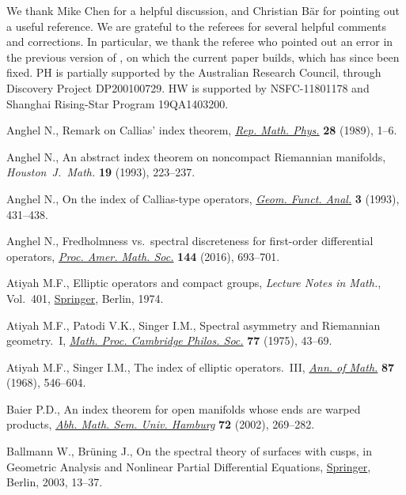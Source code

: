\documentclass[pdftex]{sigma}%
\numberwithin{equation}{section}
\begin{document}
We thank Mike Chen for a helpful discussion, and Christian B\"ar for pointing out a useful reference. We are grateful to the referees for several helpful comments and corrections. In particular, we thank the referee who pointed out an error in the previous version of \cite{HW21a}, on which the current paper builds, which has since been fixed.
PH is partially supported by the Australian Research Council, through Discovery Project DP200100729. HW is supported by NSFC-11801178 and Shanghai Rising-Star Program 19QA1403200.

\begin{thebibliography}{99}
\footnotesize\itemsep=0pt

Anghel N., Remark on {C}allias' index theorem, \href{https://doi.org/10.1016/0034-4877(89)90022-0}{\textit{Rep. Math. Phys.}}
 \textbf{28} (1989), 1--6.

Anghel N., An abstract index theorem on noncompact {R}iemannian manifolds,
 \textit{Houston~J.~Math.} \textbf{19} (1993), 223--237.

Anghel N., On the index of {C}allias-type operators, \href{https://doi.org/10.1007/BF01896237}{\textit{Geom. Funct.
 Anal.}} \textbf{3} (1993), 431--438.

Anghel N., Fredholmness vs.\ spectral discreteness for first-order differential
 operators, \href{https://doi.org/10.1090/proc12741}{\textit{Proc. Amer. Math. Soc.}} \textbf{144} (2016), 693--701.

Atiyah M.F., Elliptic operators and compact groups, \textit{Lecture Notes in
 Math.}, Vol.~401, \href{https://doi.org/10.1007/BFb0057821}{Springer}, Berlin, 1974.

Atiyah M.F., Patodi V.K., Singer I.M., Spectral asymmetry and {R}iemannian
 geometry.~{I}, \href{https://doi.org/10.1017/S0305004100049410}{\textit{Math. Proc. Cambridge Philos. Soc.}} \textbf{77}
 (1975), 43--69.

Atiyah M.F., Singer I.M., The index of elliptic operators.~{III}, \href{https://doi.org/10.2307/1970717}{\textit{Ann.
 of Math.}} \textbf{87} (1968), 546--604.

Baier P.D., An index theorem for open manifolds whose ends are warped products,
 \href{https://doi.org/10.1007/BF02941677}{\textit{Abh. Math. Sem. Univ. Hamburg}} \textbf{72} (2002), 269--282.

Ballmann W., Br\"uning J., On the spectral theory of surfaces with cusps, in
 Geometric Analysis and Nonlinear Partial Differential Equations, \href{https://doi.org/10.1007/978-3-642-55627-2_2}{Springer},
 Berlin, 2003, 13--37.


\end{thebibliography}
\end{document}

